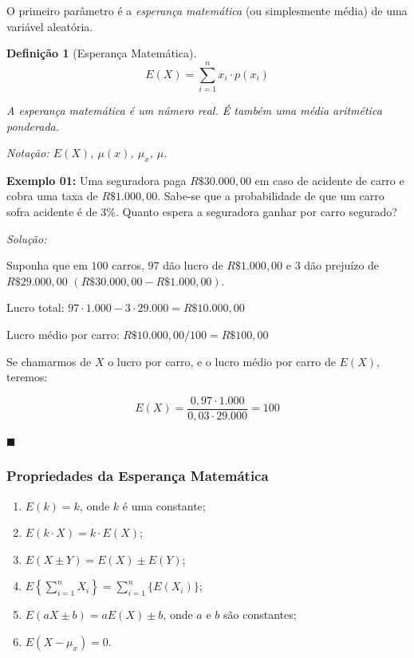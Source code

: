 \documentclass[oneside,a4paper,12pt]{article}
\newtheorem{definition}{Definição}[section]
\begin{document}
O primeiro parâmetro é a \emph{esperança matemática} (ou simplesmente média) de uma variável aleatória.

\begin{definition}[Esperança Matemática]
	$$E(X) = \displaystyle \sum_{i=1}^{n}x_i \cdot p(x_i)$$
	
	A \emph{esperança matemática} é um número real. É também uma média aritmética ponderada. 
	
	Notação: $E(X)$, $\mu(x)$, $\mu_x$, $\mu$.
\end{definition}

{\bf Exemplo 01:} Uma seguradora paga $R\$ 30.000,00$ em caso de acidente de carro e cobra uma taxa de $R\$ 1.000,00$. Sabe-se que a probabilidade de que um carro sofra acidente é de $3\%$. Quanto espera a seguradora ganhar por carro segurado?

{\it Solução:}

Suponha que em $100$ carros, $97$ dão lucro de $R\$ 1.000,00$ e $3$ dão prejuízo de $R\$ 29.000,00$ $(R\$ 30.000,00 - R\$ 1.000,00)$.

Lucro total: $97 \cdot 1.000 - 3 \cdot 29.000 = R\$ 10.000,00$

Lucro médio por carro: $R\$ 10.000,00 / 100 = R\$ 100,00$

Se chamarmos de $X$ o lucro por carro, e o lucro médio por carro de $E(X)$, teremos:

$$E(X) = \displaystyle \frac{0,97 \cdot 1.000}{0,03 \cdot 29.000} = 100$$

\begin{flushright}
	$\blacksquare$
\end{flushright}

\subsubsection{Propriedades da Esperança Matemática}
\begin{enumerate}
	\item $E(k) = k$, onde $k$ é uma constante;
	\item $E(k\cdot X) = k \cdot E(X)$;
	\item $E(X \pm Y) = E(X) \pm E(Y)$;
	\item $E\left\{ \displaystyle \sum_{i=1}^{n}X_i \right\} = \displaystyle \sum_{i=1}^{n}\{ E(X_i) \}$;
	\item $E(aX \pm b) = aE(X) \pm b$, onde $a$ e $b$ são constantes;
	\item $E(X - \mu_x) = 0$.
\end{enumerate}
\end{document}
